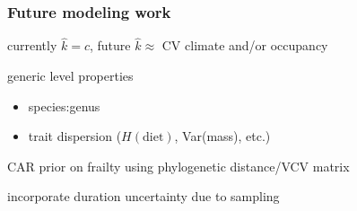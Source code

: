 \documentclass{beamer}
\begin{document}
\begin{frame}
  \frametitle{Future modeling work}

  currently \(\hat{k} = c\), future \(\hat{k} \approx\) CV climate and/or occupancy

  generic level properties 
  \begin{itemize}
    \item species:genus
    \item trait dispersion (\(H(\text{diet})\), Var(mass), etc.)
  \end{itemize}

  CAR prior on frailty using phylogenetic distance/VCV matrix

  incorporate duration uncertainty due to sampling 

\end{frame}
\end{document}
